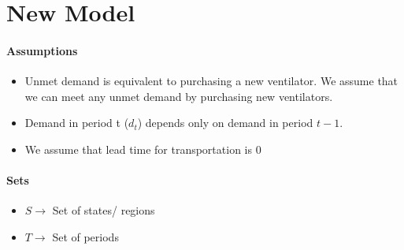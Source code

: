 \documentclass[11pt,letterpaper]{article}
\begin{document}
\begin{comment}
\subsection{Perfect Information}
A perfect information bound can be obtained when we know which scenario is realised in each stage. We generate a random path and solve the perfect information model on that path. This can be done for different sample paths each yielding it's own perfect information bound. Let $P$ be the sample path which is a sequence of scenarios realized in each stage i.e. $P_t$ denote the scenario realized in stage $t$.
In the formulation below, $\textcolor{red}{d^t_{s,{P_t}}}$ denotes the demand realization in state s in stage t in scenario $P_t$ 
\begin{align}
    \min & \sum_{t\in T}\sum_{s\in S}\big[\sum_{s_2 \in s, s_2\neq s} c_{s,s_2}x^t_{s,s_2}+pz^t_{s}\big]\\
    \text{s.t. } & u_s^t=u_s^{t-1}+\sum_{s_2\in S,s_2\neq s}x^t_{s_2,s}-\sum_{s_2\in S, s_2\neq s}x^t_{s,s_2} \qquad \forall t\ge 2, \forall s \in S\\
    & u_s^1=i_s \qquad \forall s\in S\\
    & z^t_s+u^t_s=\textcolor{red}{d^t_{s,{P_t}}}+y^t_s \qquad \forall t \in T,s \in S\\
    & \sum_{s_2\in S}x^t_{s,s_2}\le y^t_s \qquad \forall s \in S\\
    & x^t_{s_1,s_2}, u^t_s,y^t_s,z^t_s \geq 0
\end{align}
\end{comment}

\section{New Model}
\paragraph{Assumptions}
\begin{itemize}
    \item Unmet demand is equivalent to purchasing a new ventilator. We assume that we can meet any unmet demand by purchasing new ventilators.
    \item Demand in period t ($d_t$) depends only on demand in period $t-1$.
    \item We assume that lead time for transportation is 0
\end{itemize}
\paragraph{Sets}
\begin{itemize}
    \item $S\rightarrow$ Set of states/ regions
    \item $T \rightarrow$ Set of periods
\end{itemize}
\end{document}
